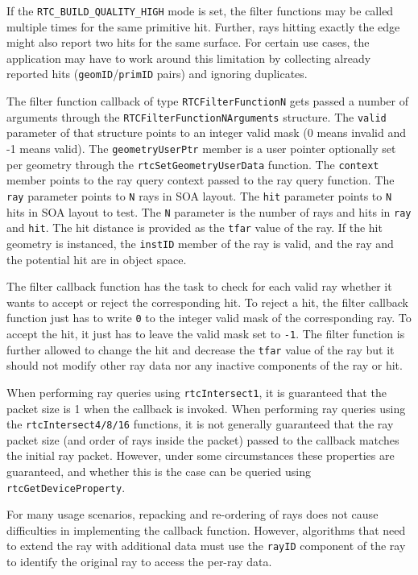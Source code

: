 If the \texttt{RTC\_BUILD\_QUALITY\_HIGH} mode is set, the filter
functions may be called multiple times for the same primitive hit.
Further, rays hitting exactly the edge might also report two hits for
the same surface. For certain use cases, the application may have to
work around this limitation by collecting already reported hits
(\texttt{geomID}/\texttt{primID} pairs) and ignoring duplicates.

The filter function callback of type \texttt{RTCFilterFunctionN} gets
passed a number of arguments through the
\texttt{RTCFilterFunctionNArguments} structure. The \texttt{valid}
parameter of that structure points to an integer valid mask (0 means
invalid and -1 means valid). The \texttt{geometryUserPtr} member is a
user pointer optionally set per geometry through the
\texttt{rtcSetGeometryUserData} function. The \texttt{context} member
points to the ray query context passed to the ray query function. The
\texttt{ray} parameter points to \texttt{N} rays in SOA layout. The
\texttt{hit} parameter points to \texttt{N} hits in SOA layout to test.
The \texttt{N} parameter is the number of rays and hits in \texttt{ray}
and \texttt{hit}. The hit distance is provided as the \texttt{tfar}
value of the ray. If the hit geometry is instanced, the \texttt{instID}
member of the ray is valid, and the ray and the potential hit are in
object space.

The filter callback function has the task to check for each valid ray
whether it wants to accept or reject the corresponding hit. To reject a
hit, the filter callback function just has to write \texttt{0} to the
integer valid mask of the corresponding ray. To accept the hit, it just
has to leave the valid mask set to \texttt{-1}. The filter function is
further allowed to change the hit and decrease the \texttt{tfar} value
of the ray but it should not modify other ray data nor any inactive
components of the ray or hit.

When performing ray queries using \texttt{rtcIntersect1}, it is
guaranteed that the packet size is 1 when the callback is invoked. When
performing ray queries using the \texttt{rtcIntersect4/8/16} functions,
it is not generally guaranteed that the ray packet size (and order of
rays inside the packet) passed to the callback matches the initial ray
packet. However, under some circumstances these properties are
guaranteed, and whether this is the case can be queried using
\texttt{rtcGetDeviceProperty}.

For many usage scenarios, repacking and re-ordering of rays does not
cause difficulties in implementing the callback function. However,
algorithms that need to extend the ray with additional data must use the
\texttt{rayID} component of the ray to identify the original ray to
access the per-ray data.


